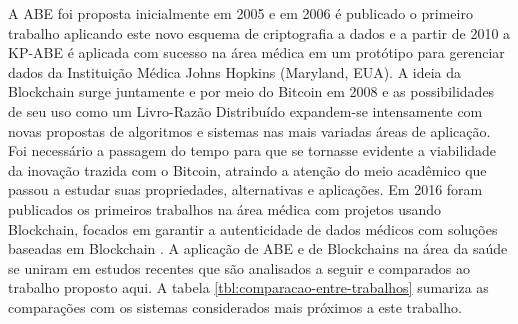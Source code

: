 \documentclass[a4paper,11pt]{article}
\begin{document}
A ABE foi proposta inicialmente em 2005 \cite{Sahai2005} e em 2006 \cite{Goyal2006} é publicado o primeiro trabalho aplicando este novo esquema de criptografia a dados e a partir de 2010 \cite{Akinyele2010} a KP-ABE é aplicada com sucesso na área médica em um protótipo para gerenciar dados da Instituição Médica Johns Hopkins (Maryland, EUA).
A ideia da Blockchain surge juntamente e por meio do Bitcoin em 2008 \cite{nakamoto2008bitcoin} e as possibilidades de seu uso como um Livro-Razão Distribuído expandem-se intensamente com novas propostas de algoritmos e sistemas nas mais variadas áreas de aplicação.
Foi necessário a passagem do tempo para que se tornasse evidente a viabilidade da inovação trazida com o Bitcoin, atraindo a atenção do meio acadêmico que passou a estudar suas propriedades, alternativas e aplicações.
Em 2016 foram publicados os primeiros trabalhos na área médica com projetos usando Blockchain, focados em garantir a autenticidade de dados médicos com soluções baseadas em Blockchain \cite{Zhang2016,Azaria2016,Ekblaw2016}.
A aplicação de ABE e de Blockchains na área da saúde se uniram em estudos recentes que são analisados a seguir e comparados ao trabalho proposto aqui.
A tabela \ref{tbl:comparacao-entre-trabalhos} sumariza as comparações com os sistemas considerados mais próximos a este trabalho.

\end{document}
